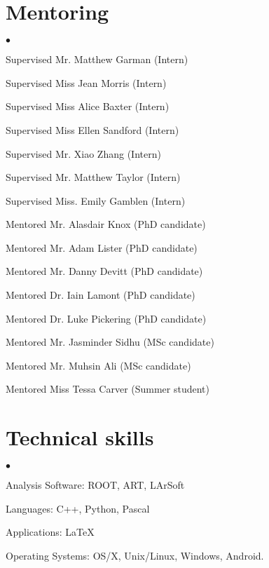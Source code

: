 \documentclass[margin,line]{res}
\newenvironment{list2}{
  \begin{list}{$\bullet$}{%
      \setlength{\itemsep}{0in}
      \setlength{\parsep}{0in} \setlength{\parskip}{0in}
      \setlength{\topsep}{0in} \setlength{\partopsep}{0in} 
      \setlength{\leftmargin}{0.2in}}}{\end{list}}
\begin{document}
\begin{resume}
\section{\sc Mentoring }
\begin{list2}
\item Supervised Mr. Matthew Garman (Intern)
\item Supervised Miss Jean Morris (Intern)
\item Supervised Miss Alice Baxter (Intern)
\item Supervised Miss Ellen Sandford (Intern)
\item Supervised Mr. Xiao Zhang (Intern)
\item Supervised Mr. Matthew Taylor (Intern)
\item Supervised Miss. Emily Gamblen (Intern)
\item Mentored Mr. Alasdair Knox (PhD candidate)
\item Mentored Mr. Adam Lister (PhD candidate)
\item Mentored Mr. Danny Devitt (PhD candidate)
\item Mentored Dr. Iain Lamont (PhD candidate)
\item Mentored Dr. Luke Pickering (PhD candidate)
\item Mentored Mr. Jasminder Sidhu (MSc candidate)
\item Mentored Mr. Muhsin Ali (MSc candidate)
\item Mentored Miss Tessa Carver (Summer student)
\end{list2}


\section{\sc Technical skills} 
\begin{list2}
\item Analysis Software: ROOT, ART, LArSoft
\item Languages: C++, Python, Pascal
\item Applications:  \LaTeX
\item Operating Systems:  OS/X, Unix/Linux, Windows, Android.
\end{list2}



\end{resume}
\end{document}
